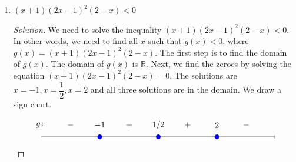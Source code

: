 \documentclass[12pt]{article}
\newenvironment{solution}{\begin{proof}[Solution]}{\end{proof}}
\begin{document}
\begin{enumerate}
\begin{enumerate}
\begin{solution}
				so this equation has no solutions, and hence $g(x)$ has no zeroes. This does NOT mean we cannot solve the inequality. 
				
				We can still draw a sign chart. 
				
				\[
				\begin{tikzpicture}[scale=1]
					\draw[->] (-4,0) -- (0,0);
					
					\draw[blue, thick, fill=white] (-2,0) circle (2.5pt);
					
					\node at (-2, .5) {-2};
					\node at (-5,.5) {$g\colon$};
					\node at (-3.5,.5) {$+$};
					\node at (-0.5,.5) {$-$};
				\end{tikzpicture}
				\]		
				
				Since we are trying to find all $x$ such that $\dfrac{-5}{x+2}$ is positive or equal to $0$, using the sign chart, we conclude that the solution is $(-\infty,-2)$.
			\end{solution}
			\item $(x+1)(2x-1)^2(2-x)<0$
			
			\begin{solution}
					We need to solve the inequality $(x+1)(2x-1)^2(2-x)< 0$. In other words, we need to find all $x$ such that $g(x) < 0$, where $g(x)=(x+1)(2x-1)^2(2-x)$. The first step is to find the domain of $g(x)$. The domain of $g(x)$ is $\mathbb{R}$. Next, we find the zeroes by solving the equation $(x+1)(2x-1)^2(2-x)=0$. The solutions are $x=-1,x=\dfrac{1}{2},x=2$ and all three solutions are in the domain.
				We draw a sign chart. 
				
				\[
				\begin{tikzpicture}[scale=1]
					\draw[->] (-7,0) -- (3,0);
					
					\draw (-2,0) node[circle,blue,fill,inner sep=2pt]{};
					\draw (-4.5,0) node[circle,blue,fill,inner sep=2pt]{};
					\draw (0.5,0) node[circle,blue,fill,inner sep=2pt]{};
					
					\node at (-2, .5) {1/2};
					\node at (-4.5, .5) {$-1$};
					\node at (0.5, .5) {2};
					\node at (-7,.5) {$g\colon$};
					\node at (-3.25,.5) {$+$};
					\node at (-0.75,.5) {$+$};
					\node at (1.75, .5) {$-$};
					\node at (-5.75, .5) {$-$};
				\end{tikzpicture}
				\]		
				

\end{solution}
\end{enumerate}
\end{enumerate}
\end{document}
